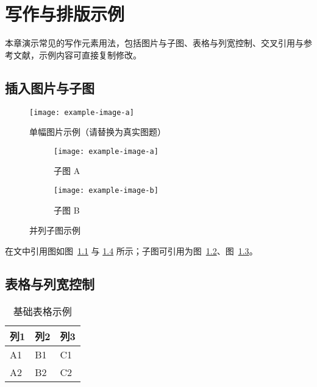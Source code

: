\chapter{写作与排版示例}\label{chap:usage}

本章演示常见的写作元素用法，包括图片与子图、表格与列宽控制、交叉引用与参考文献，示例内容可直接复制修改。

\section{插入图片与子图}
\begin{figure}[H]
  \centering
  \texttt{[image: example-image-a]} %
  \caption{单幅图片示例（请替换为真实图题）}
  \label{fig:single}
\end{figure}

\begin{figure}[H]
  \centering
  \begin{subfigure}{0.48\textwidth}
    \centering
    \texttt{[image: example-image-a]}
    \caption{子图 A}
    \label{fig:sub-a}
  \end{subfigure}
  \hfill
  \begin{subfigure}{0.48\textwidth}
    \centering
    \texttt{[image: example-image-b]}
    \caption{子图 B}
    \label{fig:sub-b}
  \end{subfigure}
  \caption{并列子图示例}
  \label{fig:subfig}
\end{figure}

在文中引用图如图~\ref{fig:single} 与 \ref{fig:subfig} 所示；子图可引用为图~\ref{fig:sub-a}、图~\ref{fig:sub-b}。

\section{表格与列宽控制}
\begin{table}[H]
  \centering
  \caption{基础表格示例}
  \label{tab:basic}
  \begin{tabular}{lll} %
    \toprule
    列1 & 列2 & 列3 \\
    \midrule
    A1 & B1 & C1 \\
    A2 & B2 & C2 \\
    \bottomrule
  \end{tabular}
\end{table}

